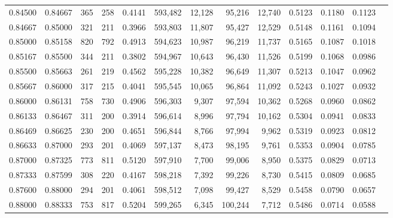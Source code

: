\begin{tabular}{rrrrrrrrrrrrr}
0.84500 & 0.84667 &   365 & 258 &                                     0.4141 & 593,482 &  12,128 &  95,216 &  12,740 & 0.5123 & 0.1180 & 0.1123 \\
0.84667 & 0.85000 &   321 & 211 &                                     0.3966 & 593,803 &  11,807 &  95,427 &  12,529 & 0.5148 & 0.1161 & 0.1094 \\
0.85000 & 0.85158 &   820 & 792 &                                     0.4913 & 594,623 &  10,987 &  96,219 &  11,737 & 0.5165 & 0.1087 & 0.1018 \\
0.85167 & 0.85500 &   344 & 211 &                                     0.3802 & 594,967 &  10,643 &  96,430 &  11,526 & 0.5199 & 0.1068 & 0.0986 \\
0.85500 & 0.85663 &   261 & 219 &                                     0.4562 & 595,228 &  10,382 &  96,649 &  11,307 & 0.5213 & 0.1047 & 0.0962 \\
0.85667 & 0.86000 &   317 & 215 &                                     0.4041 & 595,545 &  10,065 &  96,864 &  11,092 & 0.5243 & 0.1027 & 0.0932 \\
0.86000 & 0.86131 &   758 & 730 &                                     0.4906 & 596,303 &   9,307 &  97,594 &  10,362 & 0.5268 & 0.0960 & 0.0862 \\
0.86133 & 0.86467 &   311 & 200 &                                     0.3914 & 596,614 &   8,996 &  97,794 &  10,162 & 0.5304 & 0.0941 & 0.0833 \\
0.86469 & 0.86625 &   230 & 200 &                                     0.4651 & 596,844 &   8,766 &  97,994 &   9,962 & 0.5319 & 0.0923 & 0.0812 \\
0.86633 & 0.87000 &   293 & 201 &                                     0.4069 & 597,137 &   8,473 &  98,195 &   9,761 & 0.5353 & 0.0904 & 0.0785 \\
0.87000 & 0.87325 &   773 & 811 &                                     0.5120 & 597,910 &   7,700 &  99,006 &   8,950 & 0.5375 & 0.0829 & 0.0713 \\
0.87333 & 0.87599 &   308 & 220 &                                     0.4167 & 598,218 &   7,392 &  99,226 &   8,730 & 0.5415 & 0.0809 & 0.0685 \\
0.87600 & 0.88000 &   294 & 201 &                                     0.4061 & 598,512 &   7,098 &  99,427 &   8,529 & 0.5458 & 0.0790 & 0.0657 \\
0.88000 & 0.88333 &   753 & 817 &                                     0.5204 & 599,265 &   6,345 & 100,244 &   7,712 & 0.5486 & 0.0714 & 0.0588 \\

\end{tabular}
